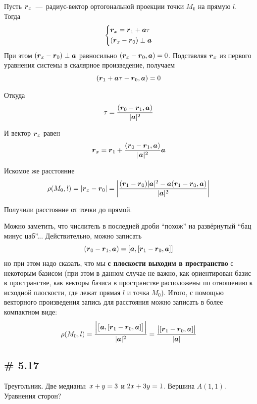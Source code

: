 \documentclass[a4paper,12pt]{article}
\begin{document}
  \begin{solution}
    Пусть $\boldsymbol r_x$~---~радиус-вектор ортогональной проекции точки $M_0$ на прямую $l$.
    Тогда
    \[
      \left\{
        \begin{aligned}
          &\boldsymbol r_x = \boldsymbol r_1 + \boldsymbol a \tau\\
          &(\boldsymbol r_x - \boldsymbol r_0) \perp \boldsymbol a
        \end{aligned}
      \right.
    \]
    При этом $(\bds r_x \hm- \bds r_0) \hm\perp \bds a$ равносильно $(\bds r_x \hm- \bds r_0, \bds a) \hm= 0$.
    Подставляя $\boldsymbol r_x$ из первого уравнения системы в скалярное произведение, получаем
    \[
      (\boldsymbol r_1 + \boldsymbol a \tau - \boldsymbol r_0, \boldsymbol a) = 0
    \]
    
    Откуда
    \[
      \tau = \frac{(\boldsymbol r_0 - \boldsymbol r_1, \boldsymbol a)}{|\boldsymbol a|^2}
    \]
    
    И вектор $\boldsymbol r_x$ равен
    \[
      \boldsymbol r_x = \boldsymbol r_1 + \frac{(\boldsymbol r_0 - \boldsymbol r_1, \boldsymbol a)}{|\boldsymbol a|^2} \boldsymbol a
    \]
    
    Искомое же расстояние
    \[
      \rho(M_0, l) = |\boldsymbol r_x - \boldsymbol r_0|
      = \left|\frac{(\boldsymbol r_1 - \boldsymbol r_0)|\boldsymbol a|^2 - \boldsymbol a (\boldsymbol r_1 - \boldsymbol r_0, \boldsymbol a)}{|\boldsymbol a|^2}\right|
    \]
    
    Получили расстояние от точки до прямой.
    
    Можно заметить, что числитель в последней дроби ``похож'' на развёрнутый ``бац минус цаб''...
    Действительно, можно записать
    \[
      (\boldsymbol r_0 - \boldsymbol r_1, \boldsymbol a) = [\boldsymbol a, [\boldsymbol r_1 - \boldsymbol r_0, \boldsymbol a]]
    \]
    но при этом надо сказать, что мы \textbf{с плоскости выходим в пространство} с некоторым базисом (при этом в данном случае не важно, как ориентирован базис в пространстве, как векторы базиса в пространстве расположены по отношению к исходной плоскости, где лежат прямая $l$ и точка $M_0$).
    Итого, с помощью векторного произведения запись для расстояния можно записать в более компактном виде:
    \[
      \rho(M_0, l) = \frac{\Bigl|\bigl[\boldsymbol a, [\boldsymbol r_1 - \boldsymbol r_0, \boldsymbol a]\bigr]\Bigr|}{|\boldsymbol a|^2}
      = \frac{\bigl|[\boldsymbol r_1 - \boldsymbol r_0, \boldsymbol a]\bigr|}{|\boldsymbol a|}
    \]
  \end{solution}
  
  
  \subsection{\# 5.17}
  
  \begin{problem}
      Треугольник.
      Две медианы: $x \hm+ y \hm= 3$ и $2x \hm+ 3y \hm= 1$.
      Вершина $A(1, 1)$.
      Уравнения сторон?
  \end{problem}
  
\end{document}
